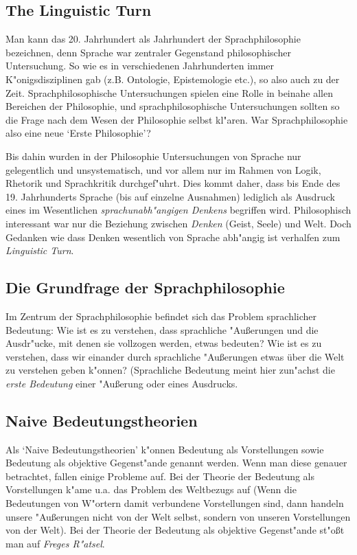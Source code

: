 \documentclass[]{scrartcl}
\begin{document}
\subsection{The Linguistic Turn}

Man kann das 20. Jahrhundert als Jahrhundert der Sprachphilosophie bezeichnen, denn Sprache war zentraler Gegenstand philosophischer Untersuchung. So wie es in verschiedenen Jahrhunderten  immer K"onigsdisziplinen gab (z.B. Ontologie, Epistemologie etc.), so also auch zu der Zeit. Sprachphilosophische Untersuchungen spielen eine Rolle in beinahe allen Bereichen der Philosophie, und sprachphilosophische Untersuchungen sollten so die Frage nach dem Wesen der Philosophie selbst kl"aren. War Sprachphilosophie also eine neue `Erste Philosophie'?

Bis dahin wurden in der Philosophie Untersuchungen von Sprache nur gelegentlich und unsystematisch, und vor allem nur im Rahmen von Logik, Rhetorik und Sprachkritik durchgef"uhrt. Dies kommt daher, dass bis Ende des 19. Jahrhunderts Sprache (bis auf einzelne Ausnahmen) lediglich als Ausdruck eines im Wesentlichen \emph{sprachunabh"angigen Denkens} begriffen wird. Philosophisch interessant war nur die Beziehung zwischen \emph{Denken} (Geist, Seele) und Welt. Doch Gedanken wie dass Denken wesentlich von Sprache abh"angig ist verhalfen zum \emph{Linguistic Turn}.


\subsection{Die Grundfrage der Sprachphilosophie}

Im Zentrum der Sprachphilosophie befindet sich das Problem sprachlicher Bedeutung: Wie ist es zu verstehen, dass sprachliche "Au\ss erungen und die Ausdr"ucke, mit denen sie vollzogen werden, etwas bedeuten? Wie ist es zu verstehen, dass wir einander durch sprachliche "Au\ss erungen etwas über die Welt zu verstehen geben k"onnen? (Sprachliche Bedeutung meint hier zun"achst die \emph{erste Bedeutung} einer "Au\ss erung oder eines Ausdrucks.

\subsection{Naive Bedeutungstheorien}

Als `Naive Bedeutungstheorien' k"onnen Bedeutung als Vorstellungen sowie Bedeutung als objektive Gegenst"ande genannt werden. Wenn man diese genauer betrachtet, fallen einige Probleme auf. Bei der Theorie der Bedeutung als Vorstellungen k"ame u.a. das Problem des Weltbezugs auf (Wenn die Bedeutungen von W"ortern damit verbundene Vorstellungen sind, dann handeln unsere "Au\ss erungen nicht von der Welt selbst, sondern von unseren Vorstellungen von der Welt). Bei der Theorie der Bedeutung als objektive Gegenst"ande st"o\ss t man auf \emph{Freges R"atsel}. \\
\end{document}
